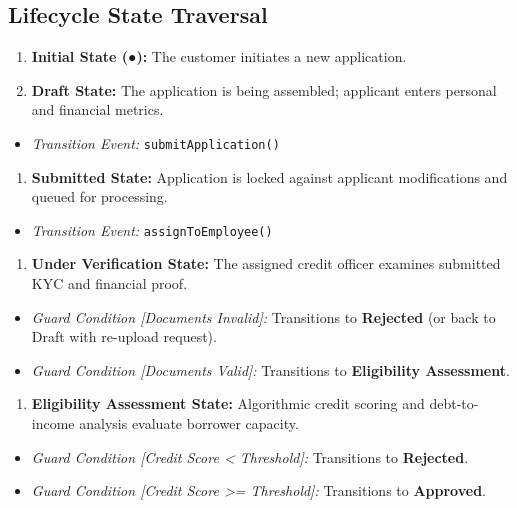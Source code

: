 \subsection{Lifecycle State Traversal}

\begin{enumerate}
  \item \textbf{Initial State (●):} The customer initiates a new application.
  \item \textbf{Draft State:} The application is being assembled; applicant enters personal and financial metrics.
\end{enumerate}

\begin{itemize}
  \item \textit{Transition Event:} \texttt{submitApplication()}
\end{itemize}

\begin{enumerate}
  \item \textbf{Submitted State:} Application is locked against applicant modifications and queued for processing.
\end{enumerate}

\begin{itemize}
  \item \textit{Transition Event:} \texttt{assignToEmployee()}
\end{itemize}

\begin{enumerate}
  \item \textbf{Under Verification State:} The assigned credit officer examines submitted KYC and financial proof.
\end{enumerate}

\begin{itemize}
  \item \textit{Guard Condition [Documents Invalid]:} Transitions to \textbf{Rejected} (or back to Draft with re-upload request).
  \item \textit{Guard Condition [Documents Valid]:} Transitions to \textbf{Eligibility Assessment}.
\end{itemize}

\begin{enumerate}
  \item \textbf{Eligibility Assessment State:} Algorithmic credit scoring and debt-to-income analysis evaluate borrower capacity.
\end{enumerate}

\begin{itemize}
  \item \textit{Guard Condition [Credit Score < Threshold]:} Transitions to \textbf{Rejected}.
  \item \textit{Guard Condition [Credit Score >= Threshold]:} Transitions to \textbf{Approved}.
\end{itemize}

